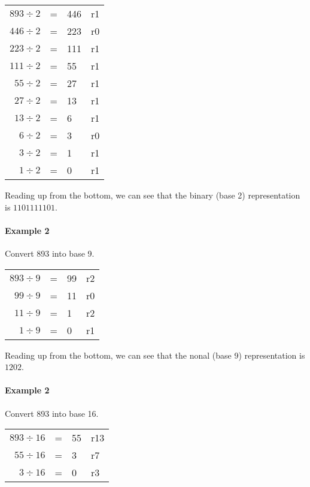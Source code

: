 \documentclass{article}
\begin{document}
\begin{center}
	\begin{tabular} {r l l l }
		$893 \div 2$ & = & 446 & r1\\
		$446 \div 2$ & = & 223 & r0\\
		$223 \div 2$ & = & 111 & r1\\
		$111 \div 2$ & = & 55 & r1\\
		$55 \div 2$ & = & 27 & r1\\
		$27 \div 2$ & = & 13 & r1\\
		$13 \div 2$ & = & 6 & r1\\
		$6 \div 2$ & = & 3 & r0\\
		$3 \div 2$ & = & 1 & r1\\
		$1 \div 2$ & = & 0 & r1\\
	\end{tabular}
\end{center}

Reading up from the bottom, we can see that the binary (base 2) representation is $1101111101$.

\paragraph{Example 2}
Convert 893 into base 9.

\begin{center}
	\begin{tabular} {r l l l }
		$893 \div 9$ & = & 99 & r2\\
		$99 \div 9$ & = & 11 & r0\\
		$11 \div 9$ & = & 1 & r2\\
		$1 \div 9$ & = & 0 & r1\\
	\end{tabular}
\end{center}

Reading up from the bottom, we can see that the nonal (base 9) representation is $1202$.

\paragraph{Example 2}
Convert 893 into base 16.

\begin{center}
	\begin{tabular} {r l l l }
		$893 \div 16$ & = & 55 & r13\\
		$55 \div 16$ & = & 3 & r7\\
		$3 \div 16$ & = & 0 & r3\\
	\end{tabular}
\end{center}
\end{document}
